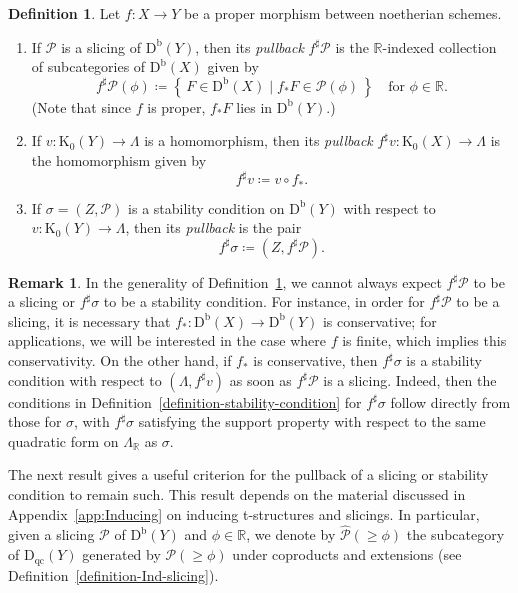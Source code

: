 \documentclass[11pt, reqno]{amsart}
\numberwithin{equation}{section}
\theoremstyle{plain}
\theoremstyle{remark}
\theoremstyle{definition}
\newtheorem{definition}[theorem]{Definition}
\newtheorem{remark}[theorem]{Remark}
\theoremstyle{italicsname}
\newcommand{\st}{\mid}
\newcommand{\set}[1]{\left\{ \, #1 \, \right\}}
\newcommand{\Db}{\mathrm{D^b}}
\newcommand{\Dqc}{\mathrm{D}_{\mathrm{qc}}}
\newcommand{\cP}{\mathscr{P}}
\newcommand{\rK}{\mathrm{K}}
\def\RR{\ensuremath{\mathbb{R}}}
\begin{document}
\begin{definition}\label{def:Pullback}
Let $f\colon X\to Y$ be a proper morphism between noetherian schemes.
\begin{enumerate}[{\rm (1)}]
\item If $\cP$ is a slicing of $\Db(Y)$, then its \emph{pullback} $f^{\sharp}\cP$ is the $\RR$-indexed collection of subcategories of $\Db(X)$ given by 
\begin{equation*}
f^{\sharp}\cP(\phi)\coloneqq \set{F \in \Db(X) \st f_*F \in \cP(\phi)} \quad \text{for } \phi \in \RR. 
\end{equation*}
(Note that since $f$ is proper, $f_*F$ lies in $\Db(Y)$.)
\item If $v \colon \rK_0(Y) \to \Lambda$ is a homomorphism, then its \emph{pullback} $f^{\sharp}v \colon \rK_0(X) \to \Lambda$ is the homomorphism   given by 
\begin{equation*}
    f^{\sharp} v \coloneqq v \circ f_*.
\end{equation*}
\item If $\sigma = (Z,\cP)$ is a stability condition on $\Db(Y)$ with respect to $v \colon \rK_0(Y) \to \Lambda$, then its \emph{pullback} is the pair
\begin{equation*}
f^{\sharp} \sigma \coloneqq (Z,f^{\sharp}\cP). 
\end{equation*}
\end{enumerate}
\end{definition}

\begin{remark}
\label{remark-pullback-slicing-stability}
In the generality of Definition~\ref{def:Pullback}, we cannot always expect $f^{\sharp}\cP$ to be a slicing or $f^{\sharp}\sigma$ to be a stability condition. 
For instance, in order for $f^{\sharp}\cP$ to be a slicing, it is necessary that $f_* \colon \Db(X) \to \Db(Y)$ is conservative; for applications, we will be interested in the case where $f$ is finite, which implies this conservativity. 
On the other hand, if $f_*$ is conservative, then $f^\sharp\sigma$ is a stability condition with respect to $(\Lambda, f^{\sharp}v)$ as soon as $f^{\sharp}\cP$ is a slicing. 
Indeed, then the conditions in Definition~\ref{definition-stability-condition} for $f^{\sharp}\sigma$ follow directly from those for $\sigma$, with $f^{\sharp}\sigma$ satisfying the support property with respect to the same quadratic form on $\Lambda_{\RR}$ as $\sigma$. 
\end{remark}

The next result gives a useful criterion for the pullback of a slicing or stability condition to remain such. 
This result depends on the material discussed in Appendix~\ref{app:Inducing} on inducing t-structures and slicings. 
In particular, given a slicing $\cP$ of $\Db(Y)$ and $\phi \in \RR$, we denote by $\widehat{\cP}(\geq \phi)$ the subcategory of $\Dqc(Y)$ generated by $\cP(\geq \phi)$ under coproducts and extensions (see Definition~\ref{definition-Ind-slicing}). 
\end{document}
